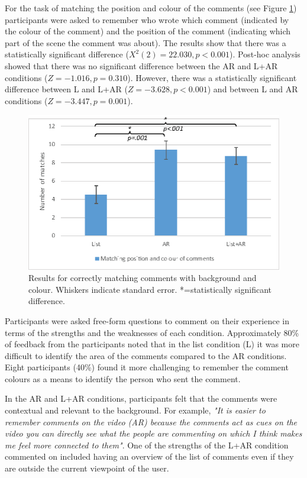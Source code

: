 For the task of matching the position and colour of the comments (see Figure \ref{fig:mgia16:questions_matching}) participants were asked to remember who wrote which comment (indicated by the colour of the comment) and the position of the comment (indicating which part of the scene the comment was about). The results show that there was a statistically significant difference ($X^2(2)=22.030, p<0.001$). Post-hoc analysis showed that there was no significant difference between the AR and L+AR conditions ($Z=-1.016, p=0.310$). However, there was a statistically significant difference between L and L+AR ($Z=-3.628, p<0.001$) and between L and AR conditions ($Z=-3.447, p=0.001$).

\begin{figure}[H]
  \centering
  \includegraphics[width=.8\linewidth]{images/mgia16/matching-02.eps}
  \caption{Results for correctly matching comments with background and colour. Whiskers indicate standard error. *=statistically significant difference.}
    \label{fig:mgia16:questions_matching}
\end{figure}

Participants were asked free-form questions to comment on their experience in terms of the strengths and the weaknesses of each condition. Approximately 80\% of feedback from the participants noted that in the list condition (L) it was more difficult to identify the area of the comments compared to the AR conditions. Eight participants (40\%) found it more challenging to remember the comment colours as a means to identify the person who sent the comment. 

In the AR and L+AR conditions, participants felt that the comments were contextual and relevant to the background. For example, \textit{"It is easier to remember comments on the video (AR) because the comments act as cues on the video you can directly see what the people are commenting on which I think makes me feel more connected to them"}. One of the strengths of the L+AR condition commented on included having an overview of the list of comments even if they are outside the current viewpoint of the user. 

